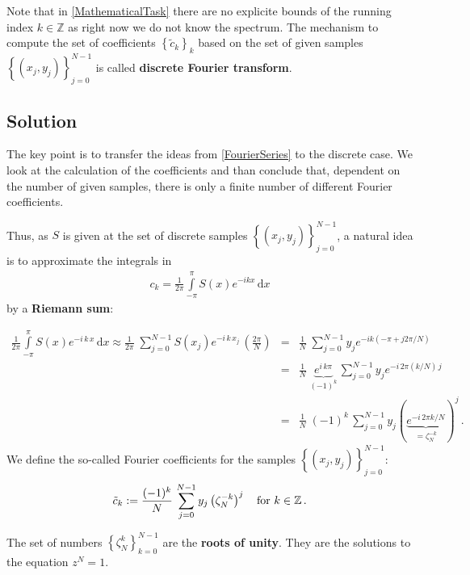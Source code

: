 \documentclass[a4paper, 10pt]{article}
\begin{document}
{Note that in \eqref{MathematicalTask} there are no explicite bounds of the running index $k\in \mathbb Z$ as right now we do not know the spectrum. The mechanism to compute the set of coefficients $\left\{ \tilde c_k\right\}_{k}$ based on the set of given samples $\left\{ \left(x_j, y_j\right) \right\}_{j=0}^{N-1}$ is called {\bf discrete Fourier transform}.

\subsection{Solution}

The key point is to transfer the ideas from \eqref{FourierSeries} to the discrete case. We look at the calculation of the coefficients and than conclude that, dependent on the number of given samples, there is only a finite number of different Fourier coefficients.

Thus, as $S$ is given at the set of discrete samples $\left\{ \left( x_j, y_j\right) \right\}_{j=0}^{N-1}$, a natural idea is to approximate the integrals in
\begin{eqnarray*}
c_k = \frac{1}{2\pi} \int\limits_{-\pi}^{\pi} S(x) e^{-i k x}\, \mathrm{d}x
\end{eqnarray*}
by a {\bf Riemann sum}:

\begin{eqnarray*}
\frac{1}{2\pi} \int\limits_{-\pi}^{\pi} S(x) e^{-i\,k\,x}\, \mathrm{d}x \approx  \frac{1}{2\pi} \; \sum\limits_{j=0}^{N-1} S(x_j) e^{-i\, k \,x_j} \, \left( \frac{2\pi}{N}\right)
&=& \frac{1}{N}  \; \sum\limits_{j=0}^{N-1} y_j e^{-ik ( -\pi + j 2\pi/N)}  \nonumber\\
&=& \frac{1}{N}  \; \underbrace{ e^{i \,k\pi} }_{\text{$(-1)^k$}} \, \sum\limits_{j=0}^{N-1} y_j e^{-i \,2\pi (k/N) \, j }\nonumber \\
&=& \frac{1}{N}  \; (-1)^k \, \sum\limits_{j=0}^{N-1} y_j \left( \underbrace{ e^{-i\,2\pi k/N} }_{\text{$=\zeta^{-k}_{N}$}} \right)^j \,.
\end{eqnarray*} We define the so-called Fourier coefficients for the samples $\left\{ (x_j, y_j) \right\}_{j=0}^{N-1}$:
\begin{equation}
\tilde c_k := \frac{(-1)^{k}}{N} \, \sum\limits_{j=0}^{N-1} y_j \left( \zeta_N^{-k}\right)^j \quad\textnormal{for } k\in \mathbb Z\,. \label{FourierCoefficientsForSamples}
\end{equation}

The set of numbers  $\left\{ \zeta^{k}_N \right\}_{k=0}^{N-1}$ are the {\bf roots of unity}. They are the solutions to the equation $z^N = 1$.

}
\end{document}
